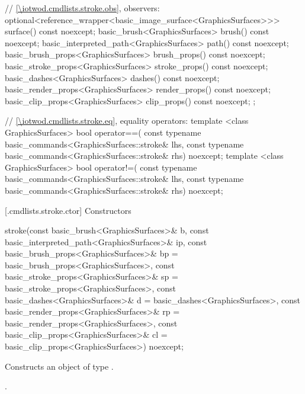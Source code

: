 \begin{codeblock}
{{    // \ref{\iotwod.cmdlists.stroke.obs}, observers:
    optional<reference_wrapper<basic_image_surface<GraphicsSurfaces>>> 
      surface() const noexcept;
    basic_brush<GraphicsSurfaces> brush() const noexcept;
    basic_interpreted_path<GraphicsSurfaces> path() const noexcept;
    basic_brush_props<GraphicsSurfaces> brush_props() const noexcept;
    basic_stroke_props<GraphicsSurfaces> stroke_props() const noexcept;
    basic_dashes<GraphicsSurfaces> dashes() const noexcept;
    basic_render_props<GraphicsSurfaces> render_props() const noexcept;
    basic_clip_props<GraphicsSurfaces> clip_props() const noexcept;
  };

  // \ref{\iotwod.cmdlists.stroke.eq}, equality operators:
  template <class GraphicsSurfaces>
  bool operator==(
    const typename basic_commands<GraphicsSurfaces::stroke& lhs,
    const typename basic_commands<GraphicsSurfaces::stroke& rhs) 
    noexcept;
  template <class GraphicsSurfaces>
  bool operator!=(
    const typename basic_commands<GraphicsSurfaces::stroke& lhs,
    const typename basic_commands<GraphicsSurfaces::stroke& rhs) 
    noexcept;
}
\end{codeblock}

 [\iotwod.cmdlists.stroke.ctor] {Constructors}%

%
\begin{itemdecl}
stroke(const basic_brush<GraphicsSurfaces>& b,
  const basic_interpreted_path<GraphicsSurfaces>& ip,
  const basic_brush_props<GraphicsSurfaces>& bp = 
  basic_brush_props<GraphicsSurfaces>{},
  const basic_stroke_props<GraphicsSurfaces>& sp = 
  basic_stroke_props<GraphicsSurfaces>{},
  const basic_dashes<GraphicsSurfaces>& d = 
  basic_dashes<GraphicsSurfaces>{},
  const basic_render_props<GraphicsSurfaces>& rp = 
  basic_render_props<GraphicsSurfaces>{},
  const basic_clip_props<GraphicsSurfaces>& cl = 
  basic_clip_props<GraphicsSurfaces>{}) noexcept;
\end{itemdecl}
\begin{itemdescr}
\pnum
\effects Constructs an object of type .

\pnum
\postconditions {}.
\end{itemdescr}

